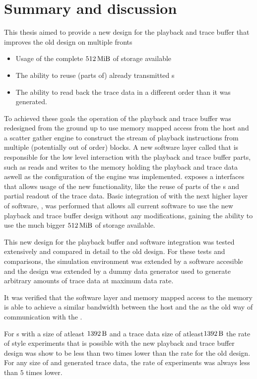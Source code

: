 \section{Summary and discussion}
This thesis aimed to provide a new design for the playback and trace buffer that improves the old design on multiple fronts
\begin{itemize}
\item Usage of the complete $\SI{512}{\mebi\byte}$ of storage available
\item The ability to reuse (parts of) already transmitted \PlaybackProgram{}s
\item The ability to read back the trace data in a different order than it was generated.
\end{itemize}
To achieved these goals the operation of the playback and trace buffer was redesigned from the ground up to use memory mapped access from the host and a scatter gather \DMA{} engine to construct the stream of playback instructions from multiple (potentially out of order) blocks. A new software layer called \ayo{} that is responsible for the low level interaction with the playback and trace buffer parts, such as reads and writes to the \DDR{} memory holding the playback and trace data aswell as the configuration of the \DMA{} engine was implemented. \ayo{} exposes a interfaces that allows usage of the new functionality, like the reuse of parts of the \PlaybackProgram{}s and partial readout of the trace data. Basic integration of \ayo{} with the next higher layer of software, \hxcomm{},  was performed that allows all current software to use the new playback and trace buffer design without any modifications, gaining the ability to use the much bigger $\SI{512}{\mebi\byte}$ of storage available.

This new design for the playback buffer and software integration was tested extensively and compared in detail to the old design. For these tests and comparisons, the simulation environment was extended by a software accesible \AXI{} \DRAM{} and the \FPGA{} design was extended by a dummy data generator used to generate arbitrary amounts of trace data at maximum data rate.

It was verified that the software layer and memory mapped access to the \DDR{} memory is able to achieve a similar bandwidth between the host and the \FPGA{} as the old way of communication with the \FPGA{}.


For \PlaybackProgram{}s with a size of atleast $\SI{1392}{\byte}$ and a trace data size of atleast$\SI{1392}{\byte}$ the rate of \HWinTheLoop{} style experiments that is possible with the new playback and trace buffer design was show to be less than two times lower than the rate for the old design. For any size of \PlaybackProgram{} and generated trace data, the rate of experiments was always less than $5$ times lower.


